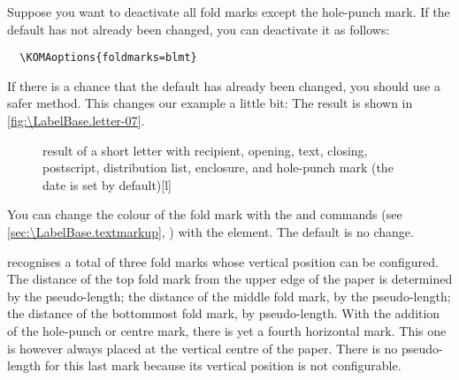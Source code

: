 %
\begin{Example}
  Suppose you want to deactivate all fold marks except the hole-punch mark. If
  the default has not already been changed, you can deactivate it as follows:
\begin{lstlisting}
  \KOMAoptions{foldmarks=blmt}
\end{lstlisting}
  If there is a chance that the default has already been changed, you should
  use a safer method. This changes our example a little bit:
  The result is shown in \autoref{fig:\LabelBase.letter-07}.
  \begin{figure}
    \setcapindent{0pt}%
    \begin{captionbeside}{%
        result of a short letter with recipient, opening, text, closing,
        postscript, distribution list, enclosure, and hole-punch mark
        (the date is set by default)}[l]
    \end{captionbeside}
    \label{fig:\LabelBase.letter-07}
  \end{figure}
\end{Example}
%
You can change the colour of the fold mark
with the  and
 commands (see
\autoref{sec:\LabelBase.textmarkup}, )
with the  element. The default is no change.%
\EndIndexGroup


\begin{Declaration}
\end{Declaration}
\KOMAScript{} recognises a total of three fold marks whose vertical position
can be configured. The distance of the top fold mark from the upper edge of
the paper is determined by the  pseudo-length; the
distance of the middle fold mark, by the
 pseudo-length; the
distance of the bottommost fold mark, by 
pseudo-length. With the addition of the hole-punch or
centre mark, there is yet a fourth
horizontal mark. This one is however always placed at the vertical centre of
the paper.
\iftrue%
There is no pseudo-length for this last mark because its vertical position is
not configurable.
\fi

